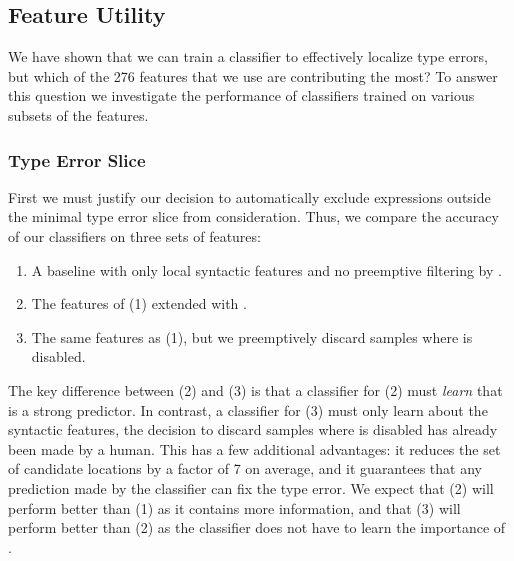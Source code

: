 \subsection{Feature Utility}
\label{sec:feature-utility}
We have shown that we can train a classifier to effectively localize
type errors, but which of the 276 features that we use are contributing
the most?
%
To answer this question we investigate the performance of
classifiers trained on various subsets of the features.

\subsubsection{Type Error Slice}
\label{sec:type-error-slice}
First we must justify our decision to automatically exclude expressions
outside the minimal type error slice from consideration.
%
%
Thus, we compare the accuracy of our classifiers on three sets of features:
%
\begin{enumerate}
\item A baseline with only local syntactic features and no
  preemptive filtering by \InSlice.
\item The features of (1) extended with \InSlice.
\item The same features as (1), but we preemptively discard samples
  where \InSlice is disabled.
\end{enumerate}
%
The key difference between (2) and (3) is that a classifier for (2) must
\emph{learn} that \InSlice is a strong predictor.
%
In contrast, a classifier for (3) must only learn about the syntactic
features, the decision to discard samples where \InSlice is disabled has
already been made by a human.
%
This has a few additional advantages: it reduces the set of candidate
locations by a factor of 7 on average, and it guarantees that any
prediction made by the classifier can fix the type error.
%
We expect that (2) will perform better than (1) as it contains more
information, and that (3) will perform better than (2) as the classifier
does not have to learn the importance of \InSlice.


